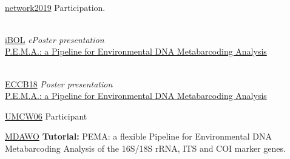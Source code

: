 \documentclass[
	a4paper,
]{fortysecondscv}
\begin{document}
\begin{cvtable}
    \\

    	{\href{https://network2019.sciencesconf.org}{network2019}}
    	{Participation.}{}

	\\
    
    	{\href{http://dnabarcodes2019.org/}{iBOL}}
    	{\textit{ePoster presentation} \\ \href{}{P.E.M.A.: a Pipeline for Environmental DNA Metabarcoding Analysis}}{}

	\\

    	{\href{https://www.iscb.org/cms_addon/events/details.php?uid=2508}{ECCB18}}
    	{\textit{Poster presentation} \\ \href{}{P.E.M.A.: a Pipeline for Environmental DNA Metabarcoding Analysis}}{}



\end{cvtable}






\begin{cvtable}

    	{\href{https://www.newton.ac.uk/event/umcw06/}{UMCW06}}
    	{Participant}{}

    	{\href{https://meetinghand.com/e/mdawo}{MDAWO}}
    	{\textbf{Tutorial:} PEMA: a flexible Pipeline for Environmental DNA Metabarcoding Analysis of the 16S/18S rRNA, ITS and COI marker genes.}{}

	

\end{cvtable}
\newpage
\makebacksidebar
\end{document}
